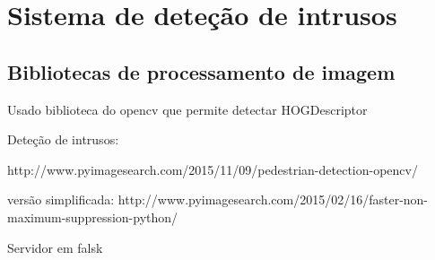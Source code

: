 

\chapter{Sistema de deteção de intrusos}


\section{Bibliotecas de processamento de imagem}


Usado biblioteca do opencv que permite detectar 
HOGDescriptor


Deteção de intrusos: 

http://www.pyimagesearch.com/2015/11/09/pedestrian-detection-opencv/



versão simplificada: http://www.pyimagesearch.com/2015/02/16/faster-non-maximum-suppression-python/



Servidor em falsk 
